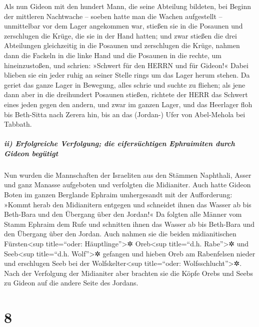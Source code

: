 Als nun Gideon mit den hundert Mann, die seine Abteilung
bildeten, bei Beginn der mittleren Nachtwache -- soeben hatte man die
Wachen aufgestellt -- unmittelbar vor dem Lager angekommen war, stießen
sie in die Posaunen und zerschlugen die Krüge, die sie in der Hand
hatten; und zwar stießen die drei Abteilungen
gleichzeitig in die Posaunen und zerschlugen die Krüge, nahmen dann die
Fackeln in die linke Hand und die Posaunen in die rechte, um
hineinzustoßen, und schrien: »Schwert für den HERRN und für Gideon!«
Dabei blieben sie ein jeder ruhig an seiner Stelle rings
um das Lager herum stehen. Da geriet das ganze Lager in Bewegung, alles
schrie und suchte zu fliehen; als jene dann aber in die
dreihundert Posaunen stießen, richtete der HERR das Schwert eines jeden
gegen den andern, und zwar im ganzen Lager, und das Heerlager floh bis
Beth-Sitta nach Zerera hin, bis an das (Jordan-) Ufer von Abel-Mehola
bei Tabbath.

\hypertarget{ii-erfolgreiche-verfolgung-die-eifersuxfcchtigen-ephraimiten-durch-gideon-beguxfctigt}{%
\subparagraph{ii) Erfolgreiche Verfolgung; die eifersüchtigen
Ephraimiten durch Gideon
begütigt}\label{ii-erfolgreiche-verfolgung-die-eifersuxfcchtigen-ephraimiten-durch-gideon-beguxfctigt}}

Nun wurden die Mannschaften der Israeliten aus den
Stämmen Naphthali, Asser und ganz Manasse aufgeboten und verfolgten die
Midianiter. Auch hatte Gideon Boten im ganzen Berglande
Ephraim umhergesandt mit der Aufforderung: »Kommt herab den Midianitern
entgegen und schneidet ihnen das Wasser ab bis Beth-Bara und den
Übergang über den Jordan!« Da folgten alle Männer vom Stamm Ephraim dem
Rufe und schnitten ihnen das Wasser ab bis Beth-Bara und den Übergang
über den Jordan. Auch nahmen sie die beiden
midianitischen Fürsten\textless sup title=``oder:
Häuptlinge''\textgreater✲ Oreb\textless sup title=``d.h.
Rabe''\textgreater✲ und Seeb\textless sup title=``d.h.
Wolf''\textgreater✲ gefangen und hieben Oreb am Rabenfelsen nieder und
erschlugen Seeb bei der Wolfskelter\textless sup title=``oder:
Wolfsschlucht''\textgreater✲. Nach der Verfolgung der Midianiter aber
brachten sie die Köpfe Orebs und Seebs zu Gideon auf die andere Seite
des Jordans.

\hypertarget{section-7}{%
\section{8}\label{section-7}}

